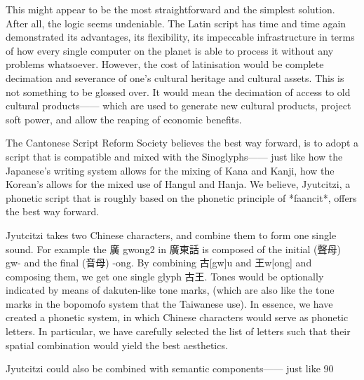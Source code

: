 This might appear to be the most straightforward and the simplest solution. After all, the logic seems undeniable. The Latin script has time and time again demonstrated its advantages, its flexibility, its impeccable infrastructure in terms of how every single computer on the planet is able to process it without any problems whatsoever. However, the cost of latinisation would be complete decimation and severance of one’s cultural heritage and cultural assets. This is not something to be glossed over. It would mean the decimation of access to old cultural products—— which are used to generate new cultural products, project soft power, and allow the reaping of economic benefits.

The Cantonese Script Reform Society believes the best way forward, is to adopt a script that is compatible and mixed with the Sinoglyphs—— just like how the Japanese’s writing system allows for the mixing of Kana and Kanji, how the Korean’s allows for the mixed use of Hangul and Hanja. We believe, Jyutcitzi, a phonetic script that is roughly based on the phonetic principle of *faancit*, offers the best way forward.

Jyutcitzi takes two Chinese characters, and combine them to form one single sound. For example the 廣 gwong2 in 廣東話 is composed of the initial (聲母) gw- and the final (音母) -ong. By combining 古[gw]u and 王w[ong] and composing them, we get one single glyph 古王. Tones would be optionally indicated by means of dakuten-like tone marks, (which are also like the tone marks in the bopomofo system that the Taiwanese use). In essence, we have created a phonetic system, in which Chinese characters would serve as phonetic letters. In particular, we have carefully selected the list of letters such that their spatial combination would yield the best aesthetics.

Jyutcitzi could also be combined with semantic components—— just like 90%

